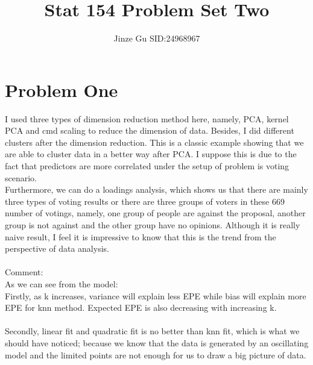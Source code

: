 \documentclass{article}\usepackage[]{graphicx}\usepackage[]{color}
\begin{document}
\title{Stat 154 Problem Set Two}


\author{Jinze Gu SID:24968967}


\maketitle

\section*{Problem One}

I used three types of dimension reduction method here, namely, PCA, kernel PCA and cmd scaling to reduce the dimension of data. Besides, I did different clusters after the dimension reduction. This is a classic example showing that we are able to cluster data in a better way after PCA. I suppose this is due to the fact that predictors are more correlated under the setup of problem is voting scenario. \\
Furthermore, we can do a loadings analysis, which shows us that there are mainly three types of voting results or there are three groups of voters in these 669 number of votings, namely, one group of people are against the proposal, another group is not against and the other group have no opinions. Although it is really naive result, I feel it is impressive to know that this is the trend from the perspective of data analysis. \\
\\
Comment: \\
As we can see from the model:\\
Firstly, as k increases, variance will explain less EPE while bias will explain more EPE for knn method. Expected EPE is also decreasing with increasing k.\\
\\
Secondly, linear fit and quadratic fit is no better than knn fit, which is what we should have noticed; because we know that the data is generated by an oscillating model and the limited points are not enough for us to draw a big picture of data.\\  
\end{document}
